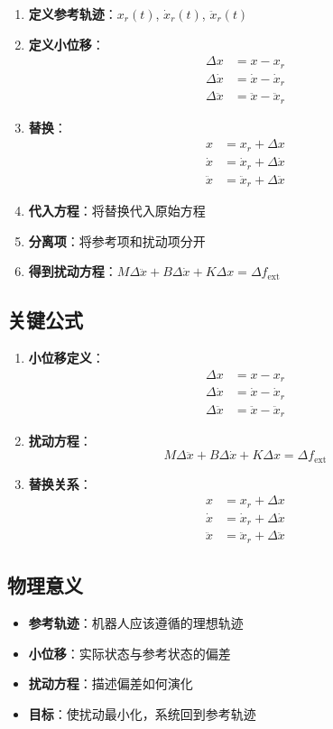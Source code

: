 \documentclass[12pt,a4paper]{article}
\begin{document}
\begin{enumerate}
\item \textbf{定义参考轨迹}：$x_r(t)$, $\dot{x}_r(t)$, $\ddot{x}_r(t)$

\item \textbf{定义小位移}：
\begin{align}
\Delta x &= x - x_r \\
\Delta \dot{x} &= \dot{x} - \dot{x}_r \\
\Delta \ddot{x} &= \ddot{x} - \ddot{x}_r
\end{align}

\item \textbf{替换}：
\begin{align}
x &= x_r + \Delta x \\
\dot{x} &= \dot{x}_r + \Delta \dot{x} \\
\ddot{x} &= \ddot{x}_r + \Delta \ddot{x}
\end{align}

\item \textbf{代入方程}：将替换代入原始方程

\item \textbf{分离项}：将参考项和扰动项分开

\item \textbf{得到扰动方程}：$M\Delta \ddot{x} + B\Delta \dot{x} + K\Delta x = \Delta f_{\text{ext}}$
\end{enumerate}

\subsection{关键公式}

\begin{enumerate}
\item \textbf{小位移定义}：
\begin{align}
\Delta x &= x - x_r \\
\Delta \dot{x} &= \dot{x} - \dot{x}_r \\
\Delta \ddot{x} &= \ddot{x} - \ddot{x}_r
\end{align}

\item \textbf{扰动方程}：
\begin{equation}
M\Delta \ddot{x} + B\Delta \dot{x} + K\Delta x = \Delta f_{\text{ext}}
\end{equation}

\item \textbf{替换关系}：
\begin{align}
x &= x_r + \Delta x \\
\dot{x} &= \dot{x}_r + \Delta \dot{x} \\
\ddot{x} &= \ddot{x}_r + \Delta \ddot{x}
\end{align}
\end{enumerate}

\subsection{物理意义}

\begin{itemize}
\item \textbf{参考轨迹}：机器人应该遵循的理想轨迹
\item \textbf{小位移}：实际状态与参考状态的偏差
\item \textbf{扰动方程}：描述偏差如何演化
\item \textbf{目标}：使扰动最小化，系统回到参考轨迹
\end{itemize}
\end{document}
